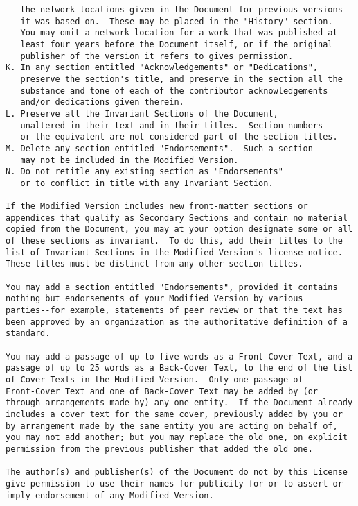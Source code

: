 \documentclass[12pt]{article}
\begin{document}
\begin{verbatim}
   the network locations given in the Document for previous versions
   it was based on.  These may be placed in the "History" section.
   You may omit a network location for a work that was published at
   least four years before the Document itself, or if the original
   publisher of the version it refers to gives permission.
K. In any section entitled "Acknowledgements" or "Dedications",
   preserve the section's title, and preserve in the section all the
   substance and tone of each of the contributor acknowledgements
   and/or dedications given therein.
L. Preserve all the Invariant Sections of the Document,
   unaltered in their text and in their titles.  Section numbers
   or the equivalent are not considered part of the section titles.
M. Delete any section entitled "Endorsements".  Such a section
   may not be included in the Modified Version.
N. Do not retitle any existing section as "Endorsements"
   or to conflict in title with any Invariant Section.

If the Modified Version includes new front-matter sections or
appendices that qualify as Secondary Sections and contain no material
copied from the Document, you may at your option designate some or all
of these sections as invariant.  To do this, add their titles to the
list of Invariant Sections in the Modified Version's license notice.
These titles must be distinct from any other section titles.

You may add a section entitled "Endorsements", provided it contains
nothing but endorsements of your Modified Version by various
parties--for example, statements of peer review or that the text has
been approved by an organization as the authoritative definition of a
standard.

You may add a passage of up to five words as a Front-Cover Text, and a
passage of up to 25 words as a Back-Cover Text, to the end of the list
of Cover Texts in the Modified Version.  Only one passage of
Front-Cover Text and one of Back-Cover Text may be added by (or
through arrangements made by) any one entity.  If the Document already
includes a cover text for the same cover, previously added by you or
by arrangement made by the same entity you are acting on behalf of,
you may not add another; but you may replace the old one, on explicit
permission from the previous publisher that added the old one.

The author(s) and publisher(s) of the Document do not by this License
give permission to use their names for publicity for or to assert or
imply endorsement of any Modified Version.



\end{verbatim}
\end{document}
